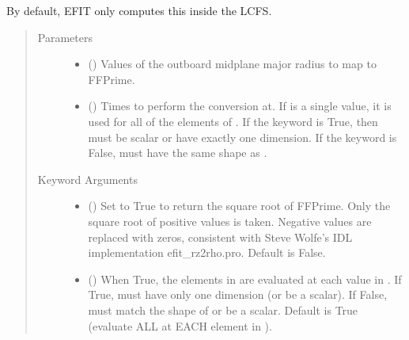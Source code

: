 \documentclass[letterpaper,10pt,english]{sphinxmanual}
\begin{document}
\begin{fulllineitems}
\begin{fulllineitems}
By default, EFIT only computes this inside the LCFS.
\begin{quote}\begin{description}
\item[{Parameters}] \leavevmode\begin{itemize}
\item {} 
 () \textendash{} Values of the outboard midplane
major radius to map to FFPrime.

\item {} 
 () \textendash{} Times to perform the conversion at.
If  is a single value, it is used for all of the elements of
. If the  keyword is True, then  must be scalar
or have exactly one dimension. If the  keyword is False,
 must have the same shape as .

\end{itemize}

\item[{Keyword Arguments}] \leavevmode\begin{itemize}
\item {} 
 () \textendash{} Set to True to return the square root of FFPrime.
Only the square root of positive values is taken. Negative
values are replaced with zeros, consistent with Steve Wolfe’s
IDL implementation efit\_rz2rho.pro. Default is False.

\item {} 
 () \textendash{} When True, the elements in  are evaluated
at each value in . If True,  must have only one dimension
(or be a scalar). If False,  must match the shape of 
or be a scalar. Default is True (evaluate ALL  at EACH
element in ).


\end{itemize}
\end{description}
\end{quote}
\end{fulllineitems}
\end{fulllineitems}
\end{document}
